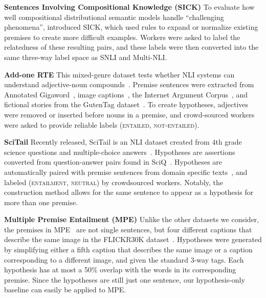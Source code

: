 \begin{datalist}
\item[] \textbf{Sentences Involving Compositional Knowledge (SICK)} To evaluate how well compositional distributional semantic models handle ``challenging phenomena'',  introduced SICK, which used rules to expand or normalize existing premises to create more difficult examples. Workers were asked to label the relatedness of these resulting pairs, and these labels were then converted into the same three-way label space as SNLI and Multi-NLI.

\item[] \textbf{Add-one RTE} This mixed-genre dataset tests whether NLI systems can understand adjective-noun compounds~\cite{P16-1204}. Premise sentences were extracted from Annotated Gigaword~\cite{napoles-gormley-vandurme:2012:AKBC-WEKEX}, image captions~\cite{young2014image}, the Internet Argument Corpus~\cite{walker2012stance}, and fictional stories from the GutenTag dataset~\cite{mac2015finding}. To create hypotheses, adjectives were removed or inserted before nouns in a premise, and crowd-sourced workers were asked to provide reliable labels (\textsc{entailed}, \textsc{not-entailed}).

\item[] \textbf{SciTail}
Recently released, SciTail is an NLI dataset created from $4$th grade science questions and multiple-choice answers~\cite{scitail}. Hypotheses are assertions converted from question-answer pairs found in SciQ~\cite{welbl2017crowdsourcing}. Hypotheses are automatically paired with premise sentences from domain specific texts~\cite{clark2016combining}, and labeled (\textsc{entailment}, \textsc{neutral}) by crowdsourced workers.  Notably, the construction method allows for the same sentence to appear as a hypothesis for more than one premise.

\item[] \textbf{Multiple Premise Entailment (MPE)} Unlike the other datasets we consider, the premises in MPE~\cite{lai-bisk-hockenmaier:2017:I17-1} are not single sentences, but four different captions that describe the same image in the FLICKR30K dataset~\cite{plummer2015flickr30k}. Hypotheses were generated by simplifying either a fifth caption that describes the same image or a caption corresponding to a different image, and given the standard 3-way tags. Each hypothesis has at most a 50\% overlap with the words in its corresponding premise. Since the hypotheses are still just one sentence, our hypothesis-only baseline can easily be applied to MPE.


\end{datalist}
